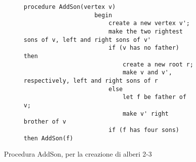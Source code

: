 \documentclass{subfiles}
\begin{document}
\begin{figure}[!h]
    \centering
    \begin{subfigure}[b]{0.85\textwidth}
        \begin{lstlisting}[language = algol]
                procedure AddSon(vertex v)
                    begin
                        create a new vertex v';
                        make the two rightest sons of v, left and right sons of v'
                        if (v has no father) then
                            create a new root r;
                            make v and v', respectively, left and right sons of r
                        else
                            let f be father of v;
                            make v' right brother of v
                        if (f has four sons) then AddSon(f)
            \end{lstlisting}
    \end{subfigure}
    \caption{Procedura AddSon, per la creazione di alberi 2-3}
    \label{Fig:5.1}
\end{figure}
\end{document}
